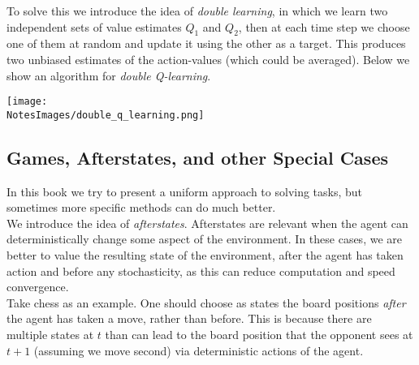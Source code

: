 To solve this we introduce the idea of \emph{double learning}, in which we learn two independent sets of value estimates $Q_1$ and $Q_2$, then at each time step we choose one of them at random and update it using the other as a target. This produces two unbiased estimates of the action-values (which could be averaged). Below we show an algorithm for \emph{double Q-learning}.

\texttt{[image: \\NotesImages/double\_q\_learning.png]}


\subsection{Games,  Afterstates, and other Special Cases}
In this book we try to present a uniform approach to solving tasks, but sometimes more specific methods can do much better. \\

We introduce the idea of \emph{afterstates}. Afterstates are relevant when the agent can deterministically change some aspect of the environment. In these cases, we are better to value the resulting state of the environment, after the agent has taken action and before any stochasticity, as this can reduce computation and speed convergence.\\

Take chess as an example. One should choose as states the board positions \emph{after} the agent has taken a move, rather than before. This is because there are multiple states at $t$ than can lead to the board position that the opponent sees at $t+1$ (assuming we move second) via deterministic actions of the agent. 
